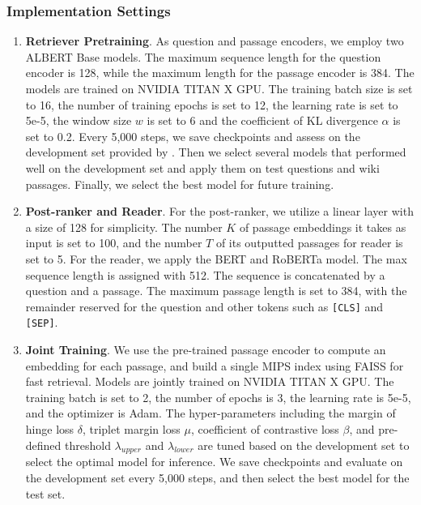 \vspace{-0.1in}
\subsubsection{Implementation Settings}
\begin{enumerate}
    \item \textbf{Retriever Pretraining}. As question and passage encoders, we employ two ALBERT Base models. The maximum sequence length for the question encoder is 128, while the maximum length for the passage encoder is 384. The models are trained on NVIDIA TITAN X GPU. The training batch size is set to 16, the number of training epochs is set to 12, the learning rate is set to 5e-5, the window size $w$ is set to 6 and the coefficient of KL divergence $\alpha$ is set to 0.2. Every 5,000 steps, we save checkpoints and assess on the development set provided by \cite{qu2020open}. Then we select several models that performed well on the development set and apply them on test questions and wiki passages. Finally, we select the best model for future training.
    \item \textbf{Post-ranker and Reader}. For the post-ranker, we utilize a linear layer with a size of 128 for simplicity. The number $K$ of passage embeddings it takes as input is set to 100, and the number $T$ of its outputted passages for reader is set to 5. For the reader, we apply the BERT and RoBERTa model. The max sequence length is assigned with 512. The sequence is concatenated by a question and a passage. The maximum passage length is set to 384, with the remainder reserved for the question and other tokens such as  \verb|[CLS]| and  \verb|[SEP]|.
    \item \textbf{Joint Training}. We use the pre-trained passage encoder to compute an embedding for each passage, and build a single MIPS index using FAISS\cite{JDH17} for fast retrieval. Models are jointly trained on NVIDIA TITAN X GPU. 
    The training batch is set to 2, the number of epochs is 3, the learning rate is 5e-5, and the optimizer is Adam.
    The hyper-parameters including the margin of hinge loss $\delta$, triplet margin loss $\mu$, coefficient of contrastive loss $\beta$, and pre-defined threshold $\lambda_{upper}$ and $\lambda_{lower}$ are tuned based on the development set to select the optimal model for inference.
    We save checkpoints and evaluate on the development set every 5,000 steps, and then select the best model for the test set.
\end{enumerate}

